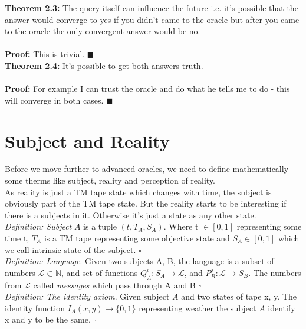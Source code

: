 \documentclass{article}
\begin{document}
\textbf{Theorem 2.3:} The query itself can influence the future i.e. it's possible that the answer would converge to yes if you didn't came to the oracle but after you came to the oracle the only convergent answer would be no. \\ \\
\textbf{Proof:} This is trivial. $\blacksquare$\\


\textbf{Theorem 2.4:} It's possible to get both answers truth. 
\\ \\
\textbf{Proof:} For example I can trust the oracle and do what he tells me to do - this will converge in both cases. $\blacksquare$\\

\section{Subject and Reality}

Before we move further to advanced oracles, we need to define mathematically some therms like subject, reality and perception of reality. \\

As reality is just a TM tape state which changes with time, the subject is obviously part of the TM tape state. But the reality starts to be interesting if there is a subjects in it. Otherwise it's just a state as any other state. \\ 

\textit{Definition: Subject} $A$ is a tuple $(t, T_{A}, S_{A})$. Where t $\in [0,1]$ representing some time t, $T_{A}$ is a TM tape representing some objective state and $S_{A} \in [0,1]$ which we call intrinsic state of the subject. $\square$ \\

\textit{Definition: Language}. Given two subjects A, B, the language is a subset of numbers $\mathscr{L} \subset \mathbb{N}$, and set of functions $Q_{A}^{i}: S_{A} \to \mathscr{L}$, and $P_{B}^{j}:\mathscr{L} \to S_{B}.$ The numbers from $\mathscr{L}$ called \textit{messages} which pass through A and B $\square$\\

\textit{Definition: The identity axiom}. Given subject $A$ and two states of tape x, y. The identity function $I_A(x, y)\to\{0,1\}$ representing weather the subject $A$ identify x and y to be the same. $\square$\\
\end{document}
